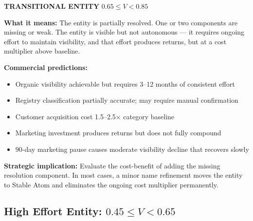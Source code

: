 \documentclass[12pt, openany]{book}
\theoremstyle{thmstyle}
\theoremstyle{defstyle}
\begin{document}
\begin{transbox}
\textbf{TRANSITIONAL ENTITY} \hfill $0.65 \leq V < 0.85$

\vspace{4pt}
\textbf{What it means:} The entity is partially resolved. One or two components are missing or weak. The entity is visible but not autonomous --- it requires ongoing effort to maintain visibility, and that effort produces returns, but at a cost multiplier above baseline.

\textbf{Commercial predictions:}
\begin{itemize}[leftmargin=1.5em, topsep=2pt]
  \item Organic visibility achievable but requires 3--12 months of consistent effort
  \item Registry classification partially accurate; may require manual confirmation
  \item Customer acquisition cost 1.5--2.5$\times$ category baseline
  \item Marketing investment produces returns but does not fully compound
  \item 90-day marketing pause causes moderate visibility decline that recovers slowly
\end{itemize}

\textbf{Strategic implication:} Evaluate the cost-benefit of adding the missing resolution component. In most cases, a minor name refinement moves the entity to Stable Atom and eliminates the ongoing cost multiplier permanently.
\end{transbox}

\subsection{High Effort Entity: $0.45 \leq V < 0.65$}
\end{document}
